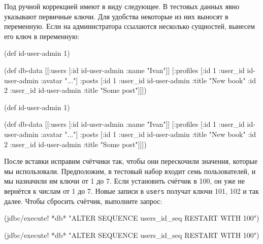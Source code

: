 Под ручной коррекцией имеют в виду следующее. В тестовых данных явно указывают
первичные ключи. Для удобства некоторые из них выносят в переменную. Если на
администратора ссылаются несколько сущностей, вынесем его ключ в переменную:

\ifx\DEVICETYPE\MOBILE

\begin{english}
  \begin{clojure}
(def id-user-admin 1)

(def db-data
  [[:users [{:id id-user-admin
             :name "Ivan"}]]
   [:profiles [{:id 1
                :user_id id-user-admin
                :avatar "..."}]
    :posts [{:id 1
             :user_id id-user-admin
             :title "New book"}
            {:id 2
             :user_id id-user-admin
             :title "Some post"}]]])
  \end{clojure}
\end{english}

\else

\begin{english}
  \begin{clojure}
(def id-user-admin 1)

(def db-data
  [[:users [{:id id-user-admin :name "Ivan"}]]
   [:profiles [{:id 1 :user_id id-user-admin :avatar "..."}]
    :posts [{:id 1 :user_id id-user-admin :title "New book"}
            {:id 2 :user_id id-user-admin :title "Some post"}]]])
  \end{clojure}
\end{english}

\fi


После вставки исправим счётчики так, чтобы они перескочили значения, которые мы
использовали. Предположим, в тестовый набор входит семь пользователей, и мы
назначили им ключи от 1 до 7. Если установить счётчик в 100, он уже не вернётся
к числам от 1 до 7. Новые записи в \verb|users| получат ключи 101, 102 и так
далее. Чтобы сбросить счётчик, выполните запрос:

\ifx\DEVICETYPE\MOBILE

\begin{english}
  \begin{clojure}
(jdbc/execute! *db*
  "ALTER SEQUENCE users_id_seq
   RESTART WITH 100")
  \end{clojure}
\end{english}

\else

\begin{english}
  \begin{clojure}
(jdbc/execute! *db*
  "ALTER SEQUENCE users_id_seq RESTART WITH 100")
  \end{clojure}
\end{english}

